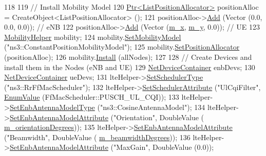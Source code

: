 \begin{DoxyCode}
118 
119   \textcolor{comment}{// Install Mobility Model}
120   \hyperlink{classns3_1_1Ptr}{Ptr<ListPositionAllocator>} positionAlloc = CreateObject<ListPositionAllocator> 
      ();
121   positionAlloc->\hyperlink{classns3_1_1ListPositionAllocator_a460e82f015ac012a73ba0ea0cccb3486}{Add} (Vector (0.0, 0.0, 0.0));  \textcolor{comment}{// eNB}
122   positionAlloc->\hyperlink{classns3_1_1ListPositionAllocator_a460e82f015ac012a73ba0ea0cccb3486}{Add} (Vector (\hyperlink{classLteEnbAntennaTestCase_a7637fedb08b5740e33a0675e883fa35e}{m\_x}, \hyperlink{classLteEnbAntennaTestCase_a97b29e700065abced8ae92ca354abf4a}{m\_y}, 0.0));  \textcolor{comment}{// UE}
123   \hyperlink{classns3_1_1MobilityHelper}{MobilityHelper} mobility;
124   mobility.\hyperlink{classns3_1_1MobilityHelper_a030275011b6f40682e70534d30280aba}{SetMobilityModel} (\textcolor{stringliteral}{"ns3::ConstantPositionMobilityModel"});
125   mobility.\hyperlink{classns3_1_1MobilityHelper_ac59d5295076be3cc11021566713a28c5}{SetPositionAllocator} (positionAlloc);
126   mobility.\hyperlink{classns3_1_1MobilityHelper_a07737960ee95c0777109cf2994dd97ae}{Install} (allNodes);
127 
128   \textcolor{comment}{// Create Devices and install them in the Nodes (eNB and UE)}
129   \hyperlink{classns3_1_1NetDeviceContainer}{NetDeviceContainer} enbDevs;
130   \hyperlink{classns3_1_1NetDeviceContainer}{NetDeviceContainer} ueDevs;
131   lteHelper->\hyperlink{classns3_1_1LteHelper_a8f86e55b8b80a81732c4b2df00fb25d5}{SetSchedulerType} (\textcolor{stringliteral}{"ns3::RrFfMacScheduler"});
132   lteHelper->\hyperlink{classns3_1_1LteHelper_a38f8c7f4592b31c0f3dedb53e7909742}{SetSchedulerAttribute} (\textcolor{stringliteral}{"UlCqiFilter"}, 
      \hyperlink{classns3_1_1EnumValue}{EnumValue} (FfMacScheduler::PUSCH\_UL\_CQI));
133   lteHelper->\hyperlink{classns3_1_1LteHelper_a758494fc0edaeaf7f311c6aa1c0b42d9}{SetEnbAntennaModelType} (\textcolor{stringliteral}{"ns3::CosineAntennaModel"});
134   lteHelper->\hyperlink{classns3_1_1LteHelper_ac0c1bc4eddaf7f8711f282cb681f99c5}{SetEnbAntennaModelAttribute} (\textcolor{stringliteral}{"Orientation"}, DoubleValue (
      \hyperlink{classLteEnbAntennaTestCase_a00b3429c0d173fa3fbdc0139fd6b3c75}{m\_orientationDegrees}));
135   lteHelper->\hyperlink{classns3_1_1LteHelper_ac0c1bc4eddaf7f8711f282cb681f99c5}{SetEnbAntennaModelAttribute} (\textcolor{stringliteral}{"Beamwidth"},   DoubleValue (
      \hyperlink{classLteEnbAntennaTestCase_a7a246ef6af585fb0d99177085d5caeba}{m\_beamwidthDegrees}));
136   lteHelper->\hyperlink{classns3_1_1LteHelper_ac0c1bc4eddaf7f8711f282cb681f99c5}{SetEnbAntennaModelAttribute} (\textcolor{stringliteral}{"MaxGain"},     DoubleValue (0.0));

\end{DoxyCode}
